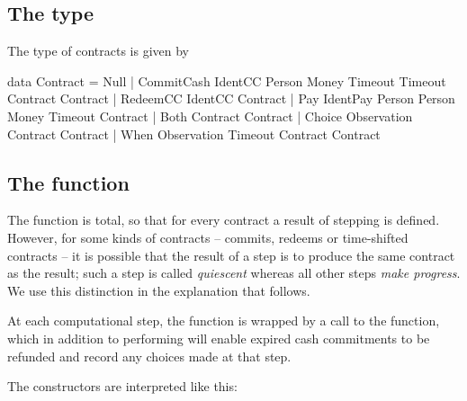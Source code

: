\documentclass[
      acmsmall
    , screen
    , review=true
  ]{acmart}
\begin{document}
\subsection{The  type}

The type of contracts is given by

\begin{haskellcode}
data Contract =
   Null |
   CommitCash IdentCC Person Money Timeout Timeout Contract Contract |  
   RedeemCC IdentCC Contract |
   Pay IdentPay Person Person Money Timeout Contract |  
   Both Contract Contract |
   Choice Observation Contract Contract |
   When Observation Timeout Contract Contract   
   \end{haskellcode}

\subsection{The  function}


The  function is total, so that for every contract a result of stepping is defined. However, for some kinds of contracts -- commits, redeems or time-shifted contracts -- it is possible that the result of a step is to produce the same contract as the result; such a step is called \emph{quiescent} whereas all other steps \emph{make progress}. We use this distinction in the explanation that follows.


At each computational step, the  function is wrapped by a call to the  function, which in addition to performing  will enable expired cash commitments to be refunded and record any choices made at that step.


The constructors are interpreted like this:
\end{document}
